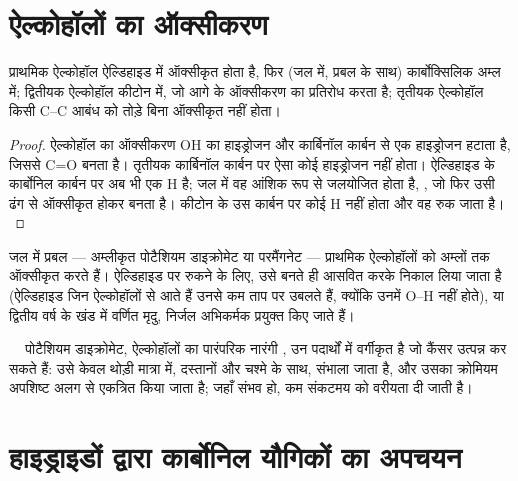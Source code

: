 \section{ऐल्कोहॉलों का ऑक्सीकरण}

\begin{proposition}[ऑक्सीकृत होने पर ऐल्कोहॉल क्या देते हैं]\label{prop:b1:organic-redox:alcohol-oxidation}
प्राथमिक ऐल्कोहॉल  ऐल्डिहाइड  में ऑक्सीकृत होता है, फिर
(जल में, प्रबल  के साथ) कार्बोक्सिलिक अम्ल  में;
द्वितीयक ऐल्कोहॉल  कीटोन  में, जो आगे के
ऑक्सीकरण का प्रतिरोध करता है; तृतीयक ऐल्कोहॉल  किसी C--C आबंध को
तोड़े बिना ऑक्सीकृत नहीं होता।
\end{proposition}

\begin{proof}
ऐल्कोहॉल का ऑक्सीकरण OH का हाइड्रोजन और कार्बिनॉल कार्बन से एक
हाइड्रोजन हटाता है, जिससे C=O बनता है। तृतीयक कार्बिनॉल कार्बन पर ऐसा कोई
हाइड्रोजन नहीं होता। ऐल्डिहाइड के कार्बोनिल कार्बन पर अब भी एक H है;
जल में वह आंशिक रूप से जलयोजित होता है, , जो फिर उसी ढंग से
ऑक्सीकृत होकर  बनता है। कीटोन के उस कार्बन पर कोई H नहीं होता और वह रुक जाता है।
\end{proof}

जल में प्रबल  --- अम्लीकृत पोटैशियम डाइक्रोमेट या
परमैंगनेट --- प्राथमिक ऐल्कोहॉलों को अम्लों तक ऑक्सीकृत करते हैं।
ऐल्डिहाइड पर रुकने के लिए, उसे बनते ही आसवित करके निकाल लिया जाता है (ऐल्डिहाइड
जिन ऐल्कोहॉलों से आते हैं उनसे कम ताप पर उबलते हैं, क्योंकि उनमें O--H  नहीं होते), या
द्वितीय वर्ष के खंड में वर्णित मृदु, निर्जल अभिकर्मक प्रयुक्त किए जाते हैं।

\begin{safety}{\,\,\,\,\,}
पोटैशियम डाइक्रोमेट, ऐल्कोहॉलों का पारंपरिक नारंगी ,
उन पदार्थों में वर्गीकृत है जो कैंसर उत्पन्न कर सकते हैं: उसे केवल
थोड़ी मात्रा में, दस्तानों और चश्मे के साथ, संभाला जाता है, और उसका क्रोमियम अपशिष्ट
अलग से एकत्रित किया जाता है; जहाँ संभव हो, कम संकटमय  को
वरीयता दी जाती है।
\end{safety}

\section{हाइड्राइडों द्वारा कार्बोनिल यौगिकों का अपचयन}

